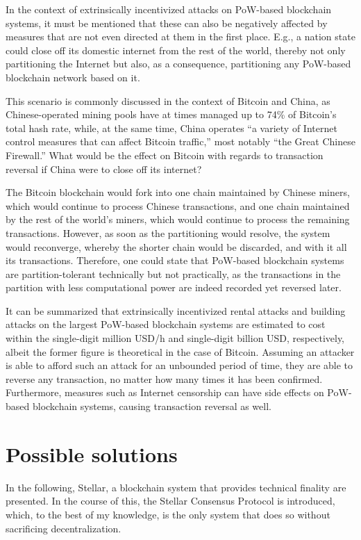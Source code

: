 In the context of extrinsically incentivized attacks on PoW-based blockchain systems, it must be mentioned that these can also be negatively affected by measures that are not even directed at them in the first place.
E.g., a nation state could close off its domestic internet from the rest of the world, thereby not only partitioning the Internet but also, as a consequence, partitioning any PoW-based blockchain network based on it.

This scenario is commonly discussed in the context of Bitcoin and China, as Chinese-operated mining pools have at times managed up to 74\% of Bitcoin's total hash rate, while, at the same time, China operates ``a variety of Internet control measures that can affect Bitcoin traffic,'' most notably ``the Great Chinese Firewall.'' \autocite[5]{kaiser2018}
What would be the effect on Bitcoin with regards to transaction reversal if China were to close off its internet?

The Bitcoin blockchain would fork into one chain maintained by Chinese miners, which would continue to process Chinese transactions, and one chain maintained by the rest of the world's miners, which would continue to process the remaining transactions.
However, as soon as the partitioning would resolve, the system would reconverge, whereby the shorter chain would be discarded, and with it all its transactions.
Therefore, one could state that PoW-based blockchain systems are partition-tolerant technically but not practically, as the transactions in the partition with less computational power are indeed recorded yet reversed later.

It can be summarized that extrinsically incentivized rental attacks and building attacks on the largest PoW-based blockchain systems are estimated to cost within the single-digit million USD/h and single-digit billion USD, respectively, albeit the former figure is theoretical in the case of Bitcoin.
Assuming an attacker is able to afford such an attack for an unbounded period of time, they are able to reverse any transaction, no matter how many times it has been confirmed.
Furthermore, measures such as Internet censorship can have side effects on PoW-based blockchain systems, causing transaction reversal as well.

\section{Possible solutions}

In the following, Stellar, a blockchain system that provides technical finality are presented.
In the course of this, the Stellar Consensus Protocol is introduced, which, to the best of my knowledge, is the only system that does so without sacrificing decentralization.

